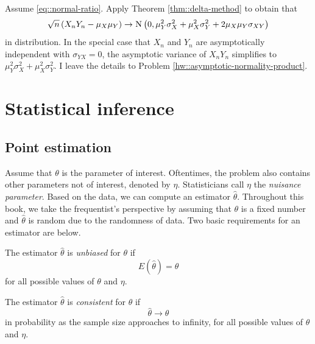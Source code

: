 \begin{example}
\label{example::asymptotic-normal-product}
Assume \eqref{eq::normal-ratio}. Apply Theorem \ref{thm::delta-method} to obtain that
\begin{equation}\label{eq::product-normality}
\sqrt{n} \left(   X_n  Y_n  -  \mu_X \mu_Y \right)
\rightarrow
\textsc{N}\left(0,     \mu_Y^2 \sigma_X^2 + \mu_X^2 \sigma_Y^2 + 2 \mu_X \mu_Y \sigma_{XY} \right)
\end{equation}
in distribution. In the special case that $X_n$ and $Y_n$ are asymptotically independent with $\sigma_{YX} = 0$, the asymptotic variance of $X_n Y_n$ simplifies to $\mu_Y^2 \sigma_X^2 + \mu_X^2 \sigma_Y^2$.
I leave the details to Problem \ref{hw::asymptotic-normality-product}.
\end{example}



\section{Statistical inference}
\label{sec::statistical-inference}

\subsection{Point estimation}


Assume that $\theta$ is the parameter of interest. Oftentimes, the problem also contains other parameters not of interest, denoted by $\eta$. Statisticians call $\eta$ the {\it nuisance parameter}. Based on the data, we can compute an estimator $\hat\theta$. Throughout this book, we take the frequentist's perspective by assuming that $\theta$ is a fixed number and $\hat\theta$ is random due to the randomness of data. Two basic requirements for an estimator are below. 

\begin{definition}
[unbiasedness]\label{def::unbiasedness}
The estimator $\hat\theta$ is {\it unbiased} for $\theta$ if 
$$
E(\hat\theta) = \theta
$$
for all possible values of $\theta$ and $\eta$. 
\end{definition}



\begin{definition}
[consistency]\label{def::consistency}
The estimator $\hat\theta$ is {\it consistent} for $\theta$ if 
$$
 \hat\theta  \rightarrow \theta
$$
in probability as the sample size approaches to infinity, for all possible values of $\theta$ and $\eta$. 
\end{definition}


